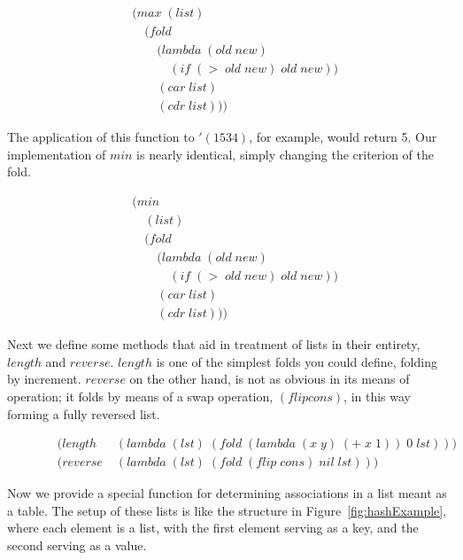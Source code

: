 \begin{figure}[htp]
\caption{}\label{fig:maxDef}
\begin{align*}
& (max \; (list)
\\& \quad (fold \; 
\\& \qquad (lambda \; (old \; new)
\\& \qquad \quad (if \; (> \; old \; new) \; old \; new))
\\& \qquad (car \; list)
\\& \qquad (cdr \; list)))
\end{align*}
\end{figure}

The application of this function to $'(1 5 3 4)$, for example, would return 5. Our 
implementation of $min$ is nearly identical, simply changing the criterion of the 
fold.

\begin{figure}[htp]
\caption{}\label{fig:minDef}
\begin{align*}
& (min \; 
\\& \quad (list)
\\& \quad (fold \; 
\\& \qquad (lambda \; (old \; new)
\\& \qquad \quad (if \; (> \; old \; new) \; old \; new))
\\& \qquad (car \; list)
\\& \qquad (cdr \; list)))
\end{align*}
\end{figure}

Next we define some methods that aid in treatment of lists in their entirety, 
$length$ and $reverse$. $length$ is one of the simplest folds you could define, 
folding by increment. $reverse$ on the other hand, is not as obvious in its means 
of operation; it folds by means of a swap operation, $(flip cons)$, in this way 
forming a fully reversed list.

\begin{figure}[htp]
\caption{}\label{fig:lengthAndRevDefs}
\begin{align*}
& (length \; &(lambda \; (lst) \; (fold \; (lambda \; (x \; y) \; (+ \; x \; 1)) \; 0 \; lst)))
\\& (reverse \; &(lambda \; (lst) \; (fold \; (flip \; cons) \; nil \; lst)))
\end{align*}
\end{figure}

Now we provide a special function for determining associations in a list meant
as a table. The setup of these lists is like the structure in
Figure~\ref{fig:hashExample}, where each element is a list, with the first
element serving as a key, and the second serving as a value.

